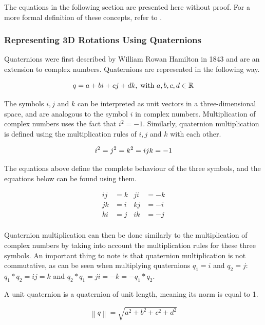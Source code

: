 The equations in the following section are presented here without proof. For a more formal definition of these concepts, refer to \cite{quaternions}.

\subsubsection{Representing 3D Rotations Using Quaternions}

Quaternions were first described by William Rowan Hamilton in 1843 and are an extension to complex numbers. Quaternions are represented in the following way.

\begin{equation}
    q = a + bi + cj + dk, \; \text{with } a, b, c, d \in \mathbb{R} \\
\end{equation}

The symbols \( i, j \) and \( k \) can be interpreted as unit vectors in a three-dimensional space, and are analogous to the symbol \( i \) in complex numbers. Multiplication of complex numbers uses the fact that \( i^2 = -1 \). Similarly, quaternion multiplication is defined using the multiplication rules of \( i, j \) and \( k \) with each other.

\begin{equation}
    i^2 = j^2 = k^2 = ijk = -1 \\
\end{equation}

The equations above define the complete behaviour of the three symbols, and the equations below can be found using them.

\begin{align*}
    ij &= k & ji &= -k \\
    jk &= i & kj &= -i \\
    ki &= j & ik &= -j \\
\end{align*}

Quaternion multiplication can then be done similarly to the multiplication of complex numbers by taking into account the multiplication rules for these three symbols. An important thing to note is that quaternion multiplication is not commutative, as can be seen when multiplying quaternions \( q_1 = i \) and \( q_2 = j \): \( q_1*q_2 = ij = k \) and \( q_2*q_1 = ji = -k = -q_1*q_2 \). 

A unit quaternion is a quaternion of unit length, meaning its norm is equal to 1. 

\begin{equation}
    \left \| q \right \| = \sqrt{a^2 + b^2 + c^2 + d^2}
\end{equation}

